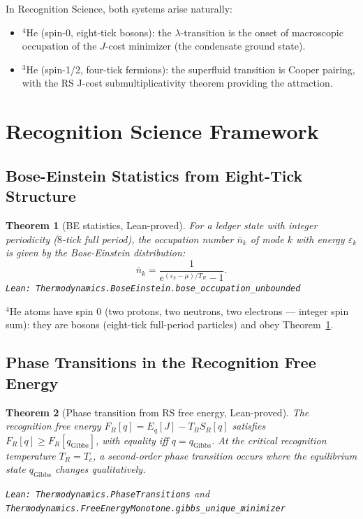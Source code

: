 \documentclass[12pt,a4paper]{article}
\newtheorem{theorem}{Theorem}[section]
\theoremstyle{definition}
\theoremstyle{remark}
\begin{document}
In Recognition Science, both systems arise naturally:
\begin{itemize}
  \item $^4$He (spin-0, eight-tick bosons): the $\lambda$-transition is
        the onset of macroscopic occupation of the $J$-cost minimizer
        (the condensate ground state).
  \item $^3$He (spin-1/2, four-tick fermions): the superfluid transition
        is Cooper pairing, with the RS J-cost submultiplicativity theorem
        providing the attraction.
\end{itemize}

\section{Recognition Science Framework}
\label{sec:rs}

\subsection{Bose-Einstein Statistics from Eight-Tick Structure}

\begin{theorem}[BE statistics, Lean-proved]\label{thm:be}
For a ledger state with integer periodicity ($8$-tick full period),
the occupation number $\bar{n}_k$ of mode $k$ with energy $\varepsilon_k$
is given by the Bose-Einstein distribution:
\begin{equation}
  \bar{n}_k = \frac{1}{e^{(\varepsilon_k - \mu)/T_R} - 1}.
\end{equation}
\texttt{Lean: Thermodynamics.BoseEinstein.bose\_occupation\_unbounded}
\end{theorem}

$^4$He atoms have spin 0 (two protons, two neutrons, two electrons —
integer spin sum): they are bosons (eight-tick full-period particles)
and obey Theorem~\ref{thm:be}.

\subsection{Phase Transitions in the Recognition Free Energy}

\begin{theorem}[Phase transition from RS free energy, Lean-proved]
\label{thm:phase}
The recognition free energy $F_R[q] = E_q[J] - T_R S_R[q]$ satisfies
$F_R[q] \geq F_R[q_\mathrm{Gibbs}]$, with equality iff $q =
q_\mathrm{Gibbs}$.  At the critical recognition temperature $T_R = T_c$,
a second-order phase transition occurs where the equilibrium state
$q_\mathrm{Gibbs}$ changes qualitatively.

\texttt{Lean: Thermodynamics.PhaseTransitions} and
\texttt{Thermodynamics.FreeEnergyMonotone.gibbs\_unique\_minimizer}
\end{theorem}
\end{document}
